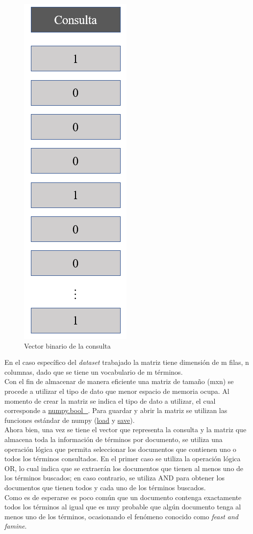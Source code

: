 \begin{figure}[]
    \centering
    \includegraphics[scale = 0.5]{doc/images/BS/b_query.PNG}
    \caption{Vector binario de la consulta}
    \label{fig:b_query}
\end{figure}

En el caso específico del \textit{dataset} trabajado la matriz tiene dimensión de m filas, n columnas, dado que se tiene un vocabulario de m términos.\\

Con el fin de almacenar de manera eficiente una matriz de tamaño (mxn) se procede a utilizar el tipo de dato que menor espacio de memoria ocupa. Al momento de crear la matriz se indica el tipo de dato a utilizar, el cual corresponde a \url{numpy.bool\_}. Para guardar y abrir la matriz se utilizan las funciones estándar de numpy (\url{load} y \url{save}).\\

Ahora bien, una vez se tiene el vector que representa la consulta y la matriz que almacena toda la información de términos por documento, se utiliza una operación lógica que permita seleccionar los documentos que contienen uno o todos los términos consultados. En el primer caso se utiliza la operación lógica OR, lo cual indica que se extraerán los documentos que tienen al menos uno de los términos buscados; en caso contrario, se utiliza AND para obtener los documentos que tienen todos y cada uno de los términos buscados.\\

Como es de esperarse es poco común que un documento contenga exactamente todos los términos al igual que es muy probable que algún documento tenga al menos uno de los términos, ocasionando el fenómeno conocido como \textit{feast and famine}.